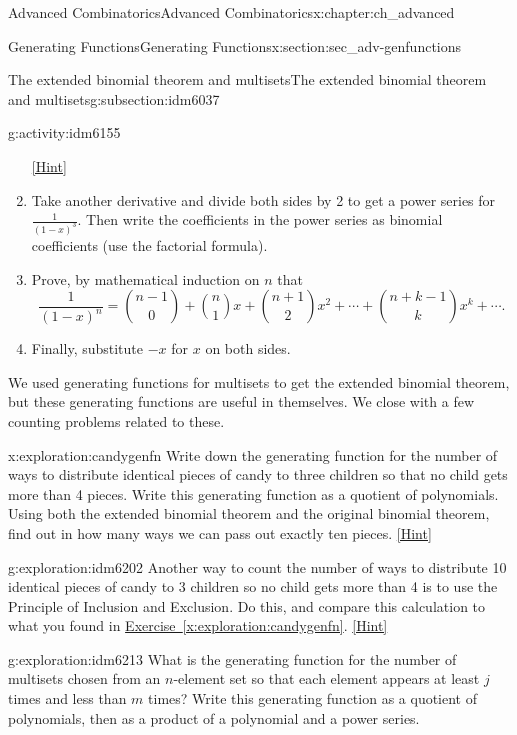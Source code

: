 \documentclass[oneside,10pt,]{book}
\numberwithin{equation}{chapter}
\begin{document}
\begin{chapterptx}{Advanced Combinatorics}{}{Advanced Combinatorics}{}{}{x:chapter:ch_advanced}
\begin{sectionptx}{Generating Functions}{}{Generating Functions}{}{}{x:section:sec_adv-genfunctions}
\begin{subsectionptx}{The extended binomial theorem and multisets}{}{The extended binomial theorem and multisets}{}{}{g:subsection:idm6037}
\begin{activity}{}{g:activity:idm6155}
\begin{enumerate}[font=\bfseries,label=(\alph*),ref=\alph*]
\space\hspace*{0pt}\hfill{\tiny\hyperlink{g:hint:idm6163-back}{[Hint]}}\item{}Take another derivative and divide both sides by 2 to get a power series for \(\frac{1}{(1-x)^3}\).  Then write the coefficients in the power series as binomial coefficients (use the factorial formula).%
\item{}Prove, by mathematical induction on \(n\) that%
\begin{equation*}
\frac{1}{(1-x)^{n}} = \binom{n-1}{0} + \binom{n}{1}x + \binom{n+1}{2}x^2 + \cdots + \binom{n+k-1}{k}x^k+ \cdots\text{.}
\end{equation*}
%
\item{}Finally, substitute \(-x\) for \(x\) on both sides.%
\end{enumerate}
\end{activity}
We used generating functions for multisets to get the extended binomial theorem, but these generating functions are useful in themselves.  We close with a few counting problems related to these.%
\begin{exploration}{}{x:exploration:candygenfn}%
Write down the generating function for the number of ways to distribute identical pieces of candy to three children so that no child gets more than 4 pieces. Write this generating function as a quotient of polynomials. Using both the extended binomial theorem and the original binomial theorem, find out in how many ways we can pass out exactly ten pieces.%
\space\hspace*{0pt}\hfill{\tiny\hyperlink{g:hint:idm6186-back}{[Hint]}}\end{exploration}
\begin{exploration}{}{g:exploration:idm6202}%
Another way to count the number of ways to distribute 10 identical pieces of candy to 3 children so no child gets more than 4 is to use the Principle of Inclusion and Exclusion.  Do this, and compare this calculation to what you found in \hyperref[x:exploration:candygenfn]{Exercise~\ref{x:exploration:candygenfn}}.%
\space\hspace*{0pt}\hfill{\tiny\hyperlink{g:hint:idm6206-back}{[Hint]}}\end{exploration}
\begin{exploration}{}{g:exploration:idm6213}%
What is the generating function for the number of multisets chosen from an \(n\)-element set so that each element appears at least \(j\) times and less than \(m\) times? Write this generating function as a quotient of polynomials, then as a product of a polynomial and a power series.%

\end{exploration}
\end{subsectionptx}
\end{sectionptx}
\end{chapterptx}
\end{document}
